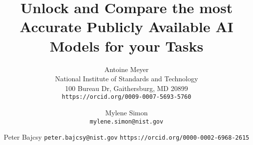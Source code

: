 \documentclass[10pt,twocolumn,letterpaper]{article}
\title{Unlock and Compare the most Accurate Publicly Available AI Models for your Tasks}
\author{Antoine Meyer\\
National Institute of Standards and Technology\\
100 Bureau Dr, Gaithersburg, MD 20899\\
{\tt\small https://orcid.org/0009-0007-5693-5760}
\and
Mylene Simon\\
{\tt\small mylene.simon@nist.gov}
\and
Peter Bajcsy
{\tt\small peter.bajcsy@nist.gov}
{\tt\small https://orcid.org/0000-0002-6968-2615}
}
\begin{document}
\maketitle






{
    \small
    
    
}
\printglossaries

% 
\end{document}
